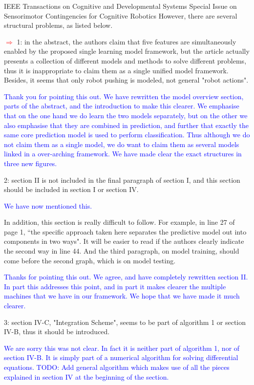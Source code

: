 \documentclass[a4paper,12pt]{letter}
\newcommand{\comment}[1]{\textcolor{blue}{#1}}
\newcommand{\marker}{\hspace*{-1.6em}\textcolor{red}{$\Longrightarrow$}}
\begin{document}
\begin{letter}{IEEE Transactions on Cognitive and Developmental Systems\newline
Special Issue on Sensorimotor Contingencies for Cognitive Robotics}
However, there are several structural problems, as listed below. 

\marker
1: in the abstract, the authors claim that five features are simultaneously enabled by the proposed single learning model framework, but the article actually presents a collection of different models and methods to solve different problems, thus it is inappropriate to claim them as a single unified model framework. Besides, it seems that only robot pushing is modeled, not general "robot actions". 

\comment{Thank you for pointing this out. We have rewritten the model overview section, parts of the abstract, and the introduction to make this clearer. We emphasise that on the one hand we do learn the two models separately, but on the other we also emphasise that they are combined in prediction, and further that exactly the same core prediction model is used to perform classification. Thus although we do not claim them as a single model, we do want to claim them as several models linked in a over-arching framework. We have made clear the exact structures in three new figures.}

2: section II is not included in the final paragraph of section I, and this section should be included in section I or section IV.

\comment{We have now mentioned this.}

In addition, this section is really difficult to follow. For example, in line 27 of page 1, “the specific approach taken here separates the predictive model out into components in two ways". It will be easier to read if the authors clearly indicate the second way in line 44. And the third paragraph, on model training, should come before the second graph, which is on model testing. 

\comment{Thanks for pointing this out. We agree, and have completely rewritten section II. In part this addresses this point, and in part it makes clearer the multiple machines that we have in our framework. We hope that we have made it much clearer.}

3: section IV-C, "Integration Scheme", seems to be part of algorithm 1 or section IV-B, thus it should be introduced.

\comment{We are sorry this was not clear. In fact it is neither part of algorithm 1, nor of section IV-B.  It is simply part of a numerical algorithm for solving differential equations. \newline TODO: Add general algorithm which makes use of all the pieces explained in section IV at the beginning of the section.}


\end{letter}
\end{document}
